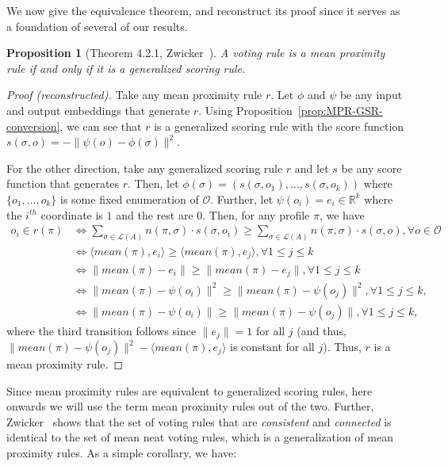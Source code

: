 \documentclass[10pt,letterpaper]{article}
\newcommand{\calL}{{\mathcal{L}}}
\newcommand{\rank}{{\calL(A)}}
\newcommand{\calO}{{\mathcal{O}}}
\newtheorem{proposition}{Proposition}
\begin{document}
We now give the equivalence theorem, and reconstruct its proof since it serves as a foundation of several of our results.
\begin{proposition}[Theorem 4.2.1, Zwicker~\cite{Zwicker08a}]
A voting rule is a mean proximity rule if and only if it is a generalized scoring rule.
\label{prop:equiv}
\end{proposition}
\begin{proof}[Proof (reconstructed)]
Take any mean proximity rule $r$. Let $\phi$ and $\psi$ be any input and output embeddings that generate $r$. Using Proposition~\ref{prop:MPR-GSR-conversion}, we can see that $r$ is a generalized scoring rule with the score function $s(\sigma,o) = -\|\psi(o)-\phi(\sigma)\|^2$. 

For the other direction, take any generalized scoring rule $r$ and let $s$ be any score function that generates $r$. Then, let $\phi(\sigma) = (s(\sigma,o_1),\ldots,s(\sigma,o_k))$ where $\{o_1,\ldots,o_k\}$ is some fixed enumeration of $\calO$. Further, let $\psi(o_i) = e_i \in \mathbb{R}^k$ where the $i^{th}$ coordinate is $1$ and the rest are $0$. Then, for any profile $\pi$, we have
\begin{align*}
o_i \in r(\pi) &\Leftrightarrow \sum_{\sigma \in \rank} n(\pi,\sigma) \cdot s(\sigma,o_i) \ge \sum_{\sigma \in \rank} n(\pi,\sigma) \cdot s(\sigma,o), \forall o \in \calO\\
&\Leftrightarrow \langle mean(\pi), e_i \rangle \ge \langle mean(\pi), e_j \rangle, \forall 1 \le j \le k \\
&\Leftrightarrow \|mean(\pi) - e_i\| \ge \|mean(\pi) - e_j\|, \forall 1 \le j \le k\\
&\Leftrightarrow \|mean(\pi) - \psi(o_i)\|^2 \ge \|mean(\pi) - \psi(o_j)\|^2, \forall 1 \le j \le k,\\
&\Leftrightarrow \|mean(\pi) - \psi(o_i)\| \ge \|mean(\pi) - \psi(o_j)\|, \forall 1 \le j \le k,
\end{align*}
where the third transition follows since $\|e_j\| = 1$ for all $j$ (and thus, $\|mean(\pi) - \psi(o_j)\|^2 - \langle mean(\pi), e_j \rangle$ is constant for all $j$). Thus, $r$ is a mean proximity rule.
\end{proof}


Since mean proximity rules are equivalent to generalized scoring rules, here onwards we will use the term mean proximity rules out of the two. Further, Zwicker~\cite{Zwicker08b} shows that the set of voting rules that are \emph{consistent} and \emph{connected} is identical to the set of mean neat voting rules, which is a generalization of mean proximity rules. As a simple corollary, we have: 
\end{document}
